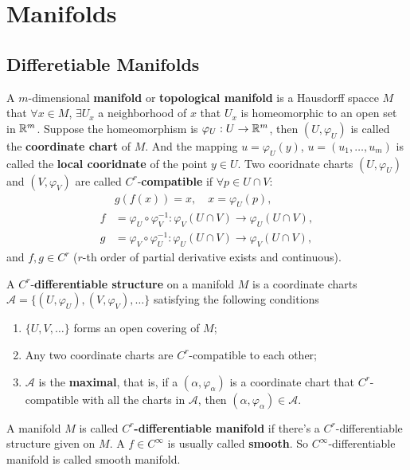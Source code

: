 \section{Manifolds}



\subsection{Differetiable Manifolds}
\begin{definition}
A $m$-dimensional \textbf{manifold} or \textbf{topological manifold} is a Hausdorff spacce $M$ that $\forall x\in M$, $\exists U_x$ a neighborhood of $x$ that $U_x$ is homeomorphic to an open set in $\mathbb{R}^m$. Suppose the homeomorphism is $\varphi_U:U\to\mathbb{R}^m$, then $(U,\varphi_U)$ is called the \textbf{coordinate chart} of $M$. And the mapping $u=\varphi_U(y)$, $u=(u_1,\dots,u_m)$ is called the \textbf{local cooridnate} of the point $y\in U$. Two cooridnate charts $(U,\varphi_U)$ and $(V,\varphi_V)$ are called $C^r$-\textbf{compatible} if $\forall p\in U\cap V$:
\begin{equation}
\begin{aligned}
&g(f(x))=x,\quad x=\varphi_U(p),\\
f&=\varphi_U\circ\varphi_V^{-1}:\varphi_V(U\cap V)\to \varphi_U(U\cap V),\\
g&=\varphi_V\circ\varphi_U^{-1}:\varphi_U(U\cap V)\to \varphi_V(U\cap V),
\end{aligned}
\end{equation}
and $f,g\in C^r$ ($r$-th order of partial derivative exists and continuous). 
\end{definition} 

\begin{definition}
A $C^r$-\textbf{differentiable structure} on a manifold $M$ is a coordinate charts $\mathcal{A}=\{(U,\varphi_U),(V,\varphi_V),\dots\}$ satisfying the following conditions
\begin{enumerate}
\item $\{U,V,\dots\}$ forms an open covering of $M$;
\item Any two coordinate charts are $C^r$-compatible to each other;
\item $\mathcal{A}$ is the \textbf{maximal}, that is, if a $(\alpha,\varphi_\alpha)$ is a coordinate chart that $C^r$-compatible with all the charts in $\mathcal{A}$, then $(\alpha,\varphi_\alpha)\in\mathcal{A}$.
\end{enumerate}
A manifold $M$ is called $C^r$\textbf{-differentiable manifold} if there's a $C^r$-differentiable structure given on $M$. A $f\in C^\infty$ is usually called \textbf{smooth}. So $C^\infty$-differentiable manifold is called smooth manifold.
\end{definition}

